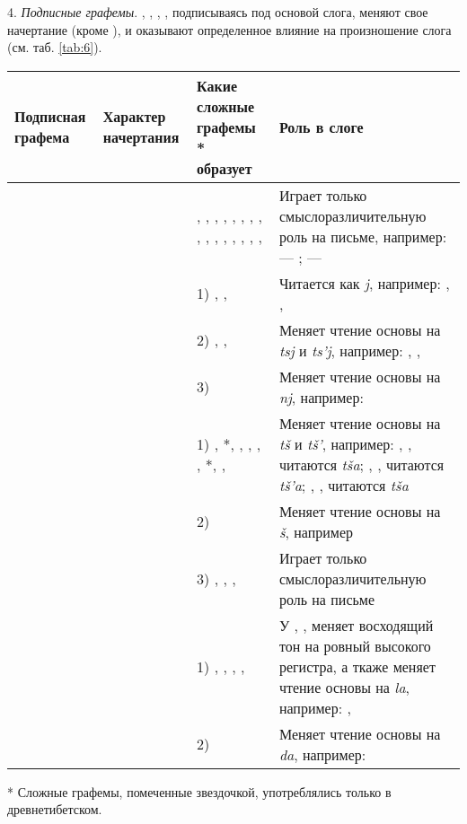 4. \emph{Подписные графемы}. , , , , подписываясь под основой слога, меняют свое начертание (кроме ), и оказывают определенное влияние на произношение слога (см. таб. \ref{tab:6}).

\begin{tabularx}{\textwidth}{|L{4}|L{4}|L{10}|L{12}|}
	\caption{Подписные графемы}\label{tab:6}\\
	\hline
	Под\-пис\-ная гра\-фе\-ма & Ха\-рак\-тер на\-чер\-та\-ния & Какие сложные графемы * образует & Роль в слоге\\
	\hline
	 &  & , , , , , , , , , , , , , , , ,  & Играет только смыслоразличительную роль на письме, например:  --- ;  --- \\
	\hline
	 &  & 1) , ,  & Читается как \textit{j}, например: , , \\
	& & 2) , ,  & Меняет чтение основы на \textit{tsj} и \textit{ts'j}, например: , , \\
	& & 3)  & Меняет чтение основы на \textit{nj}, например: \\
	\hline
	 &  & 1) , *, , , , , *, ,  & Меняет чтение основы на \textit{t\v{s}} и \textit{t\v{s}'}, например: , ,  читаются \textit{t\v{s}a\toneR}; , ,  читаются \textit{t\v{s}'a\toneR}; , ,  читаются \textit{t\v{s}a\toneV}\\
	& & 2)  & Меняет чтение основы на \textit{\v{s}}, например \\
	& & 3) , , ,  & Играет только смыслоразличительную роль на письме\\
	\hline
	 &  & 1) , , , ,  & У , ,  меняет восходящий тон на ровный высокого регистра,  а ткаже меняет чтение основы на \textit{la}, например: , \\
	& & 2)  & Меняет чтение основы на \textit{da}, например: \\
	\hline
\end{tabularx}
{\footnotesize{* Сложные графемы, помеченные звездочкой, употреблялись только в древнетибетском.}}

